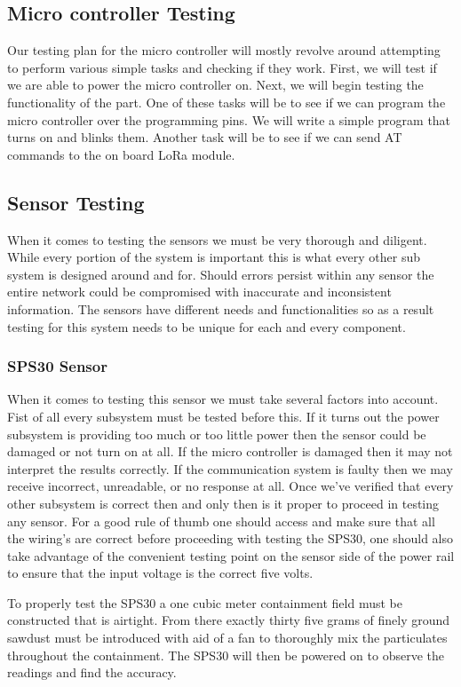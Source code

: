 \subsection{Micro controller Testing}
Our testing plan for the micro controller will mostly revolve around attempting to perform various simple tasks and checking if they work. First, we will test if we are able to power the micro controller on. Next, we will begin testing the functionality of the part. One of these tasks will be to see if we can program the micro controller over the programming pins. We will write a simple program that turns on and blinks them. Another task will be to see if we can send AT commands to the on board LoRa module.

\subsection{Sensor Testing}
When it comes to testing the sensors we must be very thorough and diligent. While every portion of the system is important this is what every other sub system is designed around and for. Should errors persist within any sensor the entire network could be compromised with inaccurate and inconsistent information. The sensors have different needs and functionalities so as a result testing for this system needs to be unique for each and every component.

\subsubsection{SPS30 Sensor}
When it comes to testing this sensor we must take several factors into account. Fist of all every subsystem must be tested before this. If it turns out the power subsystem is providing too much or too little power then the sensor could be damaged or not turn on at all. If the micro controller is damaged then it may not interpret the results correctly. If the communication system is faulty then we may receive incorrect, unreadable, or no response at all. Once we've verified that every other subsystem is correct then and only then is it proper to proceed in testing any sensor.
For a good rule of thumb one should access and make sure that all the wiring's are correct before proceeding with testing the SPS30, one should also take advantage of the convenient testing point on the sensor side of the power rail to ensure that the input voltage is the correct five volts.

To properly test the SPS30 a one cubic meter containment field must be constructed that is airtight. From there exactly thirty five grams of finely ground sawdust must be introduced with aid of a fan to thoroughly mix the particulates throughout the containment. The SPS30 will then be powered on to observe the readings and find the accuracy.

